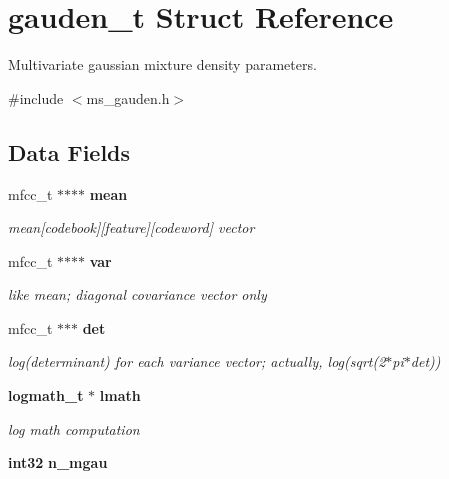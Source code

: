 \section{gauden\-\_\-t \-Struct \-Reference}
\label{structgauden__t}


\-Multivariate gaussian mixture density parameters.  




{\ttfamily \#include $<$ms\-\_\-gauden.\-h$>$}

\subsection*{\-Data \-Fields}
\begin{DoxyCompactItemize}
\item 
mfcc\-\_\-t $\ast$$\ast$$\ast$$\ast$ {\bf mean}\label{structgauden__t_aa76d63009601dcb6b99f17db96167f37}

\begin{DoxyCompactList}\small\item\em mean[codebook][feature][codeword] vector \end{DoxyCompactList}\item 
mfcc\-\_\-t $\ast$$\ast$$\ast$$\ast$ {\bf var}\label{structgauden__t_a172cb69c018608ab8c33d54e6f0fdf19}

\begin{DoxyCompactList}\small\item\em like mean; diagonal covariance vector only \end{DoxyCompactList}\item 
mfcc\-\_\-t $\ast$$\ast$$\ast$ {\bf det}\label{structgauden__t_a315918a44ff97b95a6fcdf8739d8089b}

\begin{DoxyCompactList}\small\item\em log(determinant) for each variance vector; actually, log(sqrt(2$\ast$pi$\ast$det)) \end{DoxyCompactList}\item 
{\bf logmath\-\_\-t} $\ast$ {\bf lmath}\label{structgauden__t_ae05c9b82d8a586bea347681ebe04bb83}

\begin{DoxyCompactList}\small\item\em log math computation \end{DoxyCompactList}\item 
{\bf int32} {\bf n\-\_\-mgau}\label{structgauden__t_af15df11bd2f3ab0290e0a33ca15c836c}


\end{DoxyCompactItemize}
